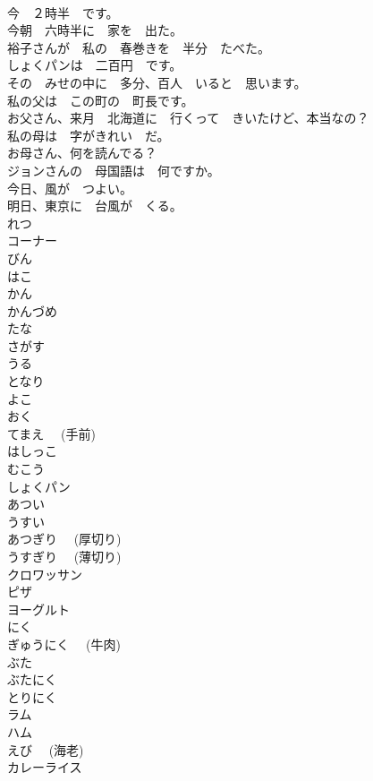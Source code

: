 \documentclass[8pt]{extreport}
\begin{document}
\begin{CJK}{UTF8}{min}
\\	今　２時半　です。	
\\	今朝　六時半に　家を　出た。	
\\	裕子さんが　私の　春巻きを　半分　たべた。	
\\	しょくパンは　二百円　です。	
\\	その　みせの中に　多分、百人　いると　思います。	
\\	私の父は　この町の　町長です。	
\\	お父さん、来月　北海道に　行くって　きいたけど、本当なの？	
\\	私の母は　字がきれい　だ。	
\\	お母さん、何を読んでる？	
\\	ジョンさんの　母国語は　何ですか。	
\\	今日、風が　つよい。	
\\	明日、東京に　台風が　くる。	
\\	れつ	
\\	コーナー	
\\	びん	
\\	はこ	
\\	かん	
\\	かんづめ	
\\	たな	
\\	さがす	
\\	うる	
\\	となり	
\\	よこ	
\\	おく	
\\	てまえ　 (手前)	
\\	はしっこ	
\\	むこう	
\\	しょくパン	
\\	あつい	
\\	うすい	
\\	あつぎり　 (厚切り)	
\\	うすぎり　 (薄切り)	
\\	クロワッサン	
\\	ピザ	
\\	ヨーグルト	
\\	にく	
\\	ぎゅうにく　 (牛肉)	
\\	ぶた	
\\	ぶたにく	
\\	とりにく	
\\	ラム	
\\	ハム	
\\	えび　 (海老)	
\\	カレーライス	

\end{CJK}
\end{document}
